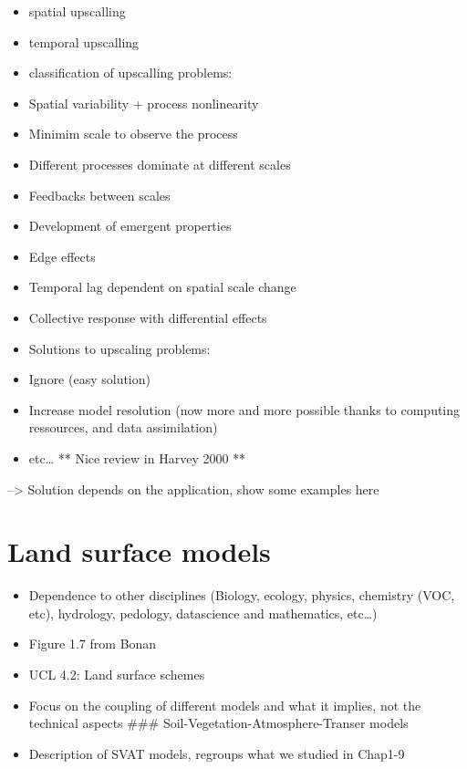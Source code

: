 \documentclass[12pt,oneside]{book}
\providecommand{\tightlist}{%
  \setlength{\itemsep}{0pt}\setlength{\parskip}{0pt}}
\begin{document}
\begin{itemize}
\tightlist
\item
  spatial upscalling
\item
  temporal upscalling
\item
  classification of upscalling problems:
\item
  Spatial variability + process nonlinearity
\item
  Minimim scale to observe the process
\item
  Different processes dominate at different scales
\item
  Feedbacks between scales
\item
  Development of emergent properties
\item
  Edge effects
\item
  Temporal lag dependent on spatial scale change
\item
  Collective response with differential effects
\item
  Solutions to upscaling problems:
\item
  Ignore (easy solution)
\item
  Increase model resolution (now more and more possible thanks to
  computing ressources, and data assimilation)
\item
  etc\ldots{} ** Nice review in Harvey 2000 **
\end{itemize}

--\textgreater{} Solution depends on the application, show some examples
here

\section{Land surface models}\label{land-surface-models}

\begin{itemize}
\tightlist
\item
  Dependence to other disciplines (Biology, ecology, physics, chemistry
  (VOC, etc), hydrology, pedology, datascience and mathematics,
  etc\ldots{})
\item
  Figure 1.7 from Bonan
\item
  UCL 4.2: Land surface schemes
\item
  Focus on the coupling of different models and what it implies, not the
  technical aspects \#\#\# Soil-Vegetation-Atmosphere-Transer models
\item
  Description of SVAT models, regroups what we studied in Chap1-9
\end{itemize}
\end{document}
